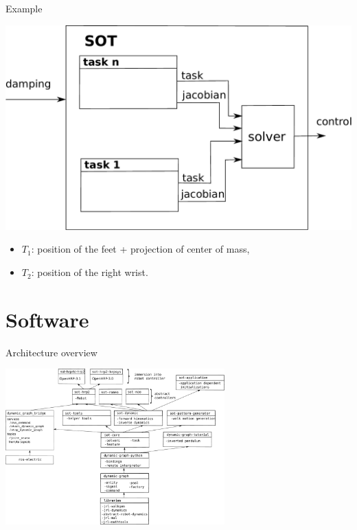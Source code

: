 \begin{frame} {Example}
\parbox {.49\linewidth} {
  \includegraphics[width=\linewidth]{figures/sot}
}
\parbox {.5\linewidth} {
  \begin{itemize}
  \item $T_1$: position of the feet + projection of center of mass,
  \item $T_2$: position of the right wrist.
  \end{itemize}
}
\end {frame}

\section {Software}

\begin{frame} {Architecture overview}
\centerline {
  \includegraphics [height=6cm] {figures/sot-architecture}
}
\end{frame}

%
%

